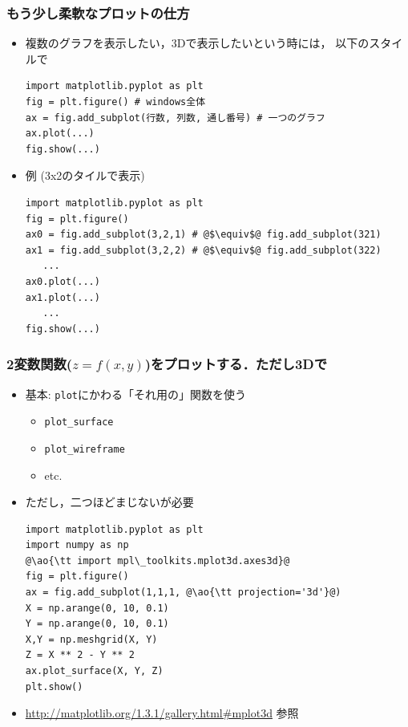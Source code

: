 \documentclass[10pt,dvipdfmx]{beamer}
\newcommand{\ao}[1]{{\color{blue}#1}}
\newcommand{\aka}[1]{{\color{red}#1}}
\begin{document}
\begin{frame}[fragile]
\frametitle{もう少し柔軟なプロットの仕方}
\begin{itemize}
\item 複数のグラフを表示したい，3Dで表示したいという時には，
以下のスタイルで
\begin{lstlisting}
import matplotlib.pyplot as plt
fig = plt.figure() # windows全体
ax = fig.add_subplot(行数, 列数, 通し番号) # 一つのグラフ
ax.plot(...)
fig.show(...)
\end{lstlisting}

\item 例 (3x2のタイルで表示)
\begin{lstlisting}
import matplotlib.pyplot as plt
fig = plt.figure()
ax0 = fig.add_subplot(3,2,1) # @$\equiv$@ fig.add_subplot(321)
ax1 = fig.add_subplot(3,2,2) # @$\equiv$@ fig.add_subplot(322)
   ...
ax0.plot(...)
ax1.plot(...)
   ...
fig.show(...)
\end{lstlisting}
\end{itemize}
\end{frame}

\begin{frame}[fragile]
\frametitle{2変数関数($z = f(x, y)$)をプロットする．\aka{ただし3Dで}}

\begin{itemize}
\item 基本: {\tt plot}にかわる「それ用の」関数を使う
  \begin{itemize}
  \item \ao{\tt plot\_surface}
  \item \ao{\tt plot\_wireframe}
  \item etc.
  \end{itemize}

\item ただし，二つほどまじないが必要
\begin{lstlisting}
import matplotlib.pyplot as plt
import numpy as np
@\ao{\tt import mpl\_toolkits.mplot3d.axes3d}@
fig = plt.figure()
ax = fig.add_subplot(1,1,1, @\ao{\tt projection='3d'}@)
X = np.arange(0, 10, 0.1)
Y = np.arange(0, 10, 0.1)
X,Y = np.meshgrid(X, Y)
Z = X ** 2 - Y ** 2
ax.plot_surface(X, Y, Z)
plt.show()
\end{lstlisting}

\item \url{http://matplotlib.org/1.3.1/gallery.html#mplot3d}
参照

\end{itemize}
\end{frame}
\end{document}
